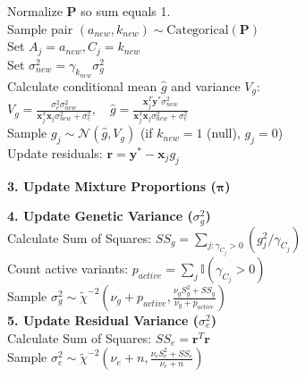 \begin{algorithm}[H]
{{        Normalize $\mathbf{P}$ so sum equals 1.\\
        Sample pair $(a_{new}, k_{new}) \sim \text{Categorical}(\mathbf{P})$\\
        Set $A_j = a_{new}, C_j = k_{new}$\\
        
        Set $\sigma^2_{new} = \gamma_{k_{new}} \sigma_g^2$\\
        Calculate conditional mean $\hat{g}$ and variance $V_g$:\\
        $V_g = \frac{\sigma_e^2 \sigma^2_{new}}{\mathbf{x}_j^T\mathbf{x}_j \sigma^2_{new} + \sigma_e^2}, \quad \hat{g} = \frac{\mathbf{x}_j^T \mathbf{y}^* \sigma^2_{new}}{\mathbf{x}_j^T\mathbf{x}_j \sigma^2_{new} + \sigma_e^2}$\\
        Sample $g_j \sim \mathcal{N}(\hat{g}, V_g)$ (if $k_{new}=1$ (null), $g_j=0$)\\
        
        Update residuals: $\mathbf{r} = \mathbf{y}^* - \mathbf{x}_j g_j$\\
    }

    \textbf{3. Update Mixture Proportions ($\boldsymbol{\pi}$)}\\

    \textbf{4. Update Genetic Variance ($\sigma_g^2$)}\\
    Calculate Sum of Squares: $SS_g = \sum_{j: \gamma_{C_j} > 0} (g_j^2 / \gamma_{C_j})$\\
    Count active variants: $p_{active} = \sum_{j} \mathbb{I}(\gamma_{C_j} > 0)$\\
    Sample $\sigma_g^2 \sim \tilde{\chi}^{-2}(\nu_g + p_{active}, \frac{\nu_g S_g^2 + SS_g}{\nu_g + p_{active}})$\\

    \textbf{5. Update Residual Variance ($\sigma_e^2$)}\\
    Calculate Sum of Squares: $SS_e = \mathbf{r}^T\mathbf{r}$\\
    Sample $\sigma_e^2 \sim \tilde{\chi}^{-2}(\nu_e + n, \frac{\nu_e S_e^2 + SS_e}{\nu_e + n})$\\
}
\end{algorithm}